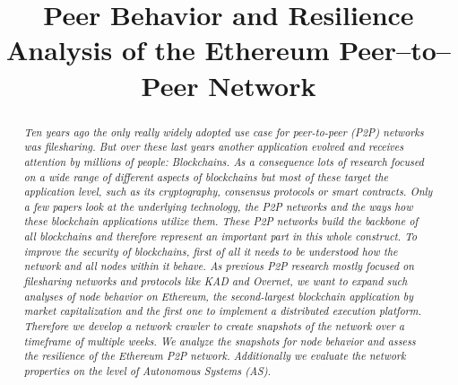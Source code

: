 \documentclass[10pt,conference,final]{IEEEtran}
\newcommand{\Hide}[1]{%
 { 
   \parindent0pt
   \emph{\scriptsize #1}
 }
}
\newcommand{\documenttitle}{Peer Behavior and Resilience Analysis of the Ethereum Peer--to--Peer Network}
\begin{document}
\title{\documenttitle}


\author{
  \IEEEauthorblockA{\\
    \\
   } 
}


\maketitle


\begin{abstract}

\Hide{
Ten years ago the only really widely adopted use case for peer-to-peer (P2P) networks was filesharing.
But over these last years another application evolved and receives attention by millions of people: Blockchains.
As a consequence lots of research focused on a wide range of different aspects of blockchains but most of these target the application level, such as its cryptography, consensus protocols or smart contracts.
Only a few papers look at the underlying technology, the P2P networks and the ways how these blockchain applications utilize them.
These P2P networks build the backbone of all blockchains and therefore represent an important part in this whole construct.
To improve the security of blockchains, first of all it needs to be understood how the network and all nodes within it behave.
As previous P2P research mostly focused on filesharing networks and protocols like KAD and Overnet, we want to expand such analyses of node behavior on Ethereum, the second-largest blockchain application by market capitalization and the first one to implement a distributed execution platform.
Therefore we develop a network crawler to create snapshots of the network over a timeframe of multiple weeks.
We analyze the snapshots for node behavior and assess the resilience of the Ethereum P2P network.
Additionally we evaluate the network properties on the level of Autonomous Systems (AS).
}
\end{abstract}
\vspace{2mm}
\end{document}
